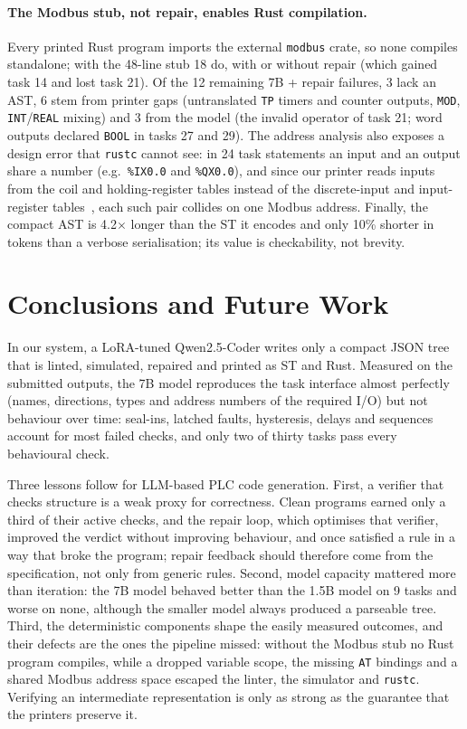 \documentclass{ceurart}
\begin{document}
\paragraph{The Modbus stub, not repair, enables Rust compilation.}
Every printed Rust program imports the external \texttt{modbus} crate, so none compiles standalone; with the 48-line stub 18 do, with or without repair (which gained task 14 and lost task 21). Of the 12 remaining 7B + repair failures, 3 lack an AST, 6 stem from printer gaps (untranslated \texttt{TP} timers and counter outputs, \texttt{MOD}, \texttt{INT}/\texttt{REAL} mixing) and 3 from the model (the invalid operator of task 21; word outputs declared \texttt{BOOL} in tasks 27 and 29). The address analysis also exposes a design error that \texttt{rustc} cannot see: in 24 task statements an input and an output share a number (e.g.\ \texttt{\%IX0.0} and \texttt{\%QX0.0}), and since our printer reads inputs from the coil and holding-register tables instead of the discrete-input and input-register tables~\cite{modbus2012}, each such pair collides on one Modbus address. Finally, the compact AST is 4.2$\times$ longer than the ST it encodes and only 10\% shorter in tokens than a verbose serialisation; its value is checkability, not brevity.

\section{Conclusions and Future Work}

In our system, a LoRA-tuned Qwen2.5-Coder writes only a compact JSON tree that is linted, simulated, repaired and printed as ST and Rust. Measured on the submitted outputs, the 7B model reproduces the task interface almost perfectly (names, directions, types and address numbers of the required I/O) but not behaviour over time: seal-ins, latched faults, hysteresis, delays and sequences account for most failed checks, and only two of thirty tasks pass every behavioural check.

Three lessons follow for LLM-based PLC code generation. First, a verifier that checks structure is a weak proxy for correctness. Clean programs earned only a third of their active checks, and the repair loop, which optimises that verifier, improved the verdict without improving behaviour, and once satisfied a rule in a way that broke the program; repair feedback should therefore come from the specification, not only from generic rules. Second, model capacity mattered more than iteration: the 7B model behaved better than the 1.5B model on 9 tasks and worse on none, although the smaller model always produced a parseable tree. Third, the deterministic components shape the easily measured outcomes, and their defects are the ones the pipeline missed: without the Modbus stub no Rust program compiles, while a dropped variable scope, the missing \texttt{AT} bindings and a shared Modbus address space escaped the linter, the simulator and \texttt{rustc}. Verifying an intermediate representation is only as strong as the guarantee that the printers preserve it.
\end{document}
